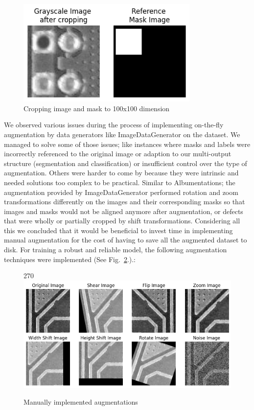 \documentclass[12pt]{article}
\begin{document}
\begin{figure}[h]
    \centering
    \includegraphics[width=0.8\textwidth]{./graphics/croppedimagewithmask.png}
    \caption{Cropping image and mask to 100x100 dimension}
    \label{fig:croppedimagewithmask}
\end{figure}
\clearpage
We observed various issues during the process of implementing on-the-fly augmentation by data generators like ImageDataGenerator\cite{TensorFlowImageDataGenerator} on the dataset. We managed to solve some of those issues; like instances where masks and labels were incorrectly referenced to the original image or adaption to our multi-output structure (segmentation and classification) or insufficient control over the type of augmentation. Others were harder to come by because they were intrinsic and needed solutions too complex to be practical. Similar to Albumentations; the  augmentation provided by ImageDataGenerator performed rotation and zoom transformations differently on the images and their corresponding masks so that images and masks would not be aligned anymore after augmentation, or defects that were wholly or partially cropped by shift transformations. Considering all this we concluded that it would be beneficial to invest time in implementing manual augmentation for the cost of having to save all the augmented dataset to disk. For training a robust and reliable model, the following augmentation techniques were implemented (See Fig.~\ref{fig:manual_augmentation}.).:

\begin{figure}[h]
    \centering
    \begin{turn}{270}
    \includegraphics[width=1\textwidth]{./graphics/manual augmentation.png}
    \end{turn}
    \caption{Manually implemented augmentations}
    \label{fig:manual_augmentation}
\end{figure}
\end{document}
